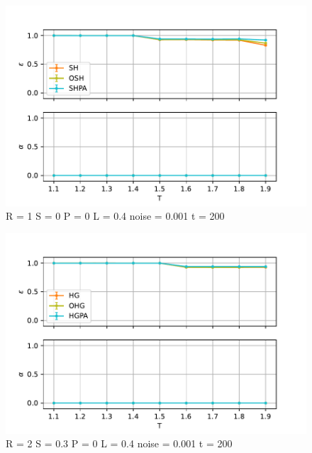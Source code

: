 \documentclass[12pt,oneside,a4paper,fleqn]{article}
\begin{document}
\begin{figure}
    \centering
    \includegraphics{Images/alpha_eps-20230606-124900.pdf}
    \caption{R = 1
        S = 0
        P = 0
        L = 0.4
        noise = 0.001
        t = 200}
    \label{fig:enter-label}
\end{figure}

\begin{figure}
    \centering
    \includegraphics{Images/alpha_eps-20230606-130744.pdf}
    \caption{R = 2
        S = 0.3
        P = 0
        L = 0.4
        noise = 0.001
        t = 200}
    \label{fig:enter-label}
\end{figure}
\end{document}
